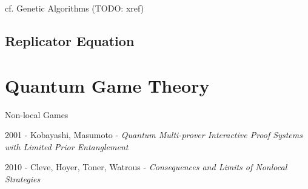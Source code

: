 cf. Genetic Algorithms (TODO: xref)



\subsection{Replicator Equation}\label{sec:replicator_equation}



\section{Quantum Game Theory}\label{sec:quantum_game_theory}

Non-local Games

2001 - Kobayashi, Masumoto - \emph{Quantum Multi-prover Interactive Proof
  Systems with Limited Prior Entanglement}

2010 - Cleve, Hoyer, Toner, Watrous -
\emph{Consequences and Limits of Nonlocal Strategies}
